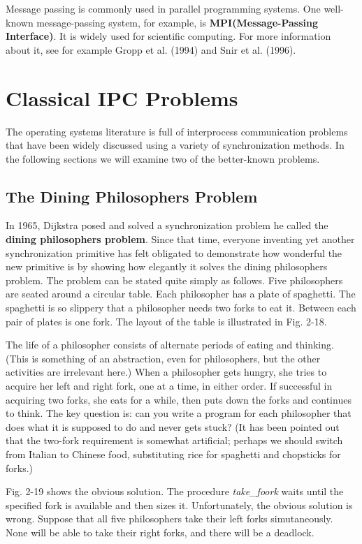 \documentclass{book}
\newcommand {\kw}  [1] {\textbf{#1}}
\newcommand {\sys} [1] {\textsl{#1}}
\begin{document}
Message passing is commonly used in parallel programming systems.
One well-known message-passing system, for example, is \kw{MPI(Message-Passing Interface)}.
It is widely used for scientific computing.
For more information about it, see for example Gropp et al. (1994) and Snir et al. (1996). 

\section{Classical IPC Problems}
The operating systems literature is full of interprocess communication problems 
that have been widely discussed using a variety of synchronization methods.
In the following sections we will examine two of the better-known problems.

\subsection{The Dining Philosophers Problem}
In 1965, Dijkstra posed and solved a synchronization problem he called the \kw{dining philosophers problem}.
Since that time, everyone inventing yet another synchronization primitive has felt obligated to 
demonstrate how wonderful the new primitive is by showing how elegantly it solves the dining philosophers problem.
The problem can be stated quite simply as follows.
Five philosophers are seated around a circular table.
Each philosopher has a plate of spaghetti.
The spaghetti is so slippery that a philosopher needs two forks to eat it.
Between each pair of plates is one fork.
The layout of the table is illustrated in Fig. 2-18.

The life of a philosopher consists of alternate periods of eating and thinking.
(This is something of an abstraction, even for philosophers, but the other activities are irrelevant here.)
When a philosopher gets hungry, she tries to acquire her left and right fork, one at a time, in either order.
If successful in acquiring two forks, she eats for a while, then puts down the forks and continues to think.
The key question is: can you write a program for each philosopher that does what it is supposed to do and never gets stuck?
(It has been pointed out that the two-fork requirement is somewhat artificial; 
perhaps we should switch from Italian to Chinese food, substituting rice for spaghetti and chopsticks for forks.)

Fig. 2-19 shows the obvious solution.
The procedure \sys{take\_foork} waits until the specified fork is available and then sizes it.
Unfortunately, the obvious solution is wrong.
Suppose that all five philosophers take their left forks simutaneously.
None will be able to take their right forks, and there will be a deadlock.
\end{document}
